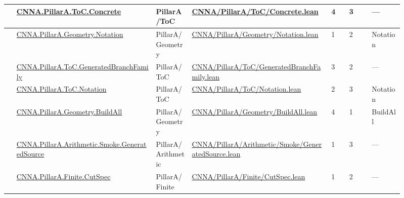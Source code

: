 \begin{longtable}{L{0.025\linewidth} L{0.315\linewidth} L{0.08\linewidth} L{0.315\linewidth} L{0.045\linewidth} L{0.055\linewidth} L{0.07\linewidth}}
\hline
{} & \href{run:repo_snapshot/CNNA/PillarA/ToC/Concrete.lean}{CNNA.\allowbreak{}PillarA.\allowbreak{}ToC.\allowbreak{}Concrete} & PillarA/\allowbreak{}ToC & \href{run:repo_snapshot/CNNA/PillarA/ToC/Concrete.lean}{CNNA/\allowbreak{}PillarA/\allowbreak{}ToC/\allowbreak{}Concrete.\allowbreak{}lean} & 4 & 3 & ---\\
\hline
{} & \href{run:repo_snapshot/CNNA/PillarA/Geometry/Notation.lean}{CNNA.\allowbreak{}PillarA.\allowbreak{}Geometry.\allowbreak{}Notation} & PillarA/\allowbreak{}Geometry & \href{run:repo_snapshot/CNNA/PillarA/Geometry/Notation.lean}{CNNA/\allowbreak{}PillarA/\allowbreak{}Geometry/\allowbreak{}Notation.\allowbreak{}lean} & 1 & 2 & Notation\\
\hline
{} & \href{run:repo_snapshot/CNNA/PillarA/ToC/GeneratedBranchFamily.lean}{CNNA.\allowbreak{}PillarA.\allowbreak{}ToC.\allowbreak{}GeneratedBranchFamily} & PillarA/\allowbreak{}ToC & \href{run:repo_snapshot/CNNA/PillarA/ToC/GeneratedBranchFamily.lean}{CNNA/\allowbreak{}PillarA/\allowbreak{}ToC/\allowbreak{}GeneratedBranchFamily.\allowbreak{}lean} & 3 & 2 & ---\\
\hline
{} & \href{run:repo_snapshot/CNNA/PillarA/ToC/Notation.lean}{CNNA.\allowbreak{}PillarA.\allowbreak{}ToC.\allowbreak{}Notation} & PillarA/\allowbreak{}ToC & \href{run:repo_snapshot/CNNA/PillarA/ToC/Notation.lean}{CNNA/\allowbreak{}PillarA/\allowbreak{}ToC/\allowbreak{}Notation.\allowbreak{}lean} & 2 & 3 & Notation\\
\hline
{} & \href{run:repo_snapshot/CNNA/PillarA/Geometry/BuildAll.lean}{CNNA.\allowbreak{}PillarA.\allowbreak{}Geometry.\allowbreak{}BuildAll} & PillarA/\allowbreak{}Geometry & \href{run:repo_snapshot/CNNA/PillarA/Geometry/BuildAll.lean}{CNNA/\allowbreak{}PillarA/\allowbreak{}Geometry/\allowbreak{}BuildAll.\allowbreak{}lean} & 4 & 1 & BuildAll\\
\hline
{} & \href{run:repo_snapshot/CNNA/PillarA/Arithmetic/Smoke/GeneratedSource.lean}{CNNA.\allowbreak{}PillarA.\allowbreak{}Arithmetic.\allowbreak{}Smoke.\allowbreak{}GeneratedSource} & PillarA/\allowbreak{}Arithmetic & \href{run:repo_snapshot/CNNA/PillarA/Arithmetic/Smoke/GeneratedSource.lean}{CNNA/\allowbreak{}PillarA/\allowbreak{}Arithmetic/\allowbreak{}Smoke/\allowbreak{}GeneratedSource.\allowbreak{}lean} & 1 & 3 & ---\\
\hline
{} & \href{run:repo_snapshot/CNNA/PillarA/Finite/CutSpec.lean}{CNNA.\allowbreak{}PillarA.\allowbreak{}Finite.\allowbreak{}CutSpec} & PillarA/\allowbreak{}Finite & \href{run:repo_snapshot/CNNA/PillarA/Finite/CutSpec.lean}{CNNA/\allowbreak{}PillarA/\allowbreak{}Finite/\allowbreak{}CutSpec.\allowbreak{}lean} & 1 & 2 & ---\\

\end{longtable}
